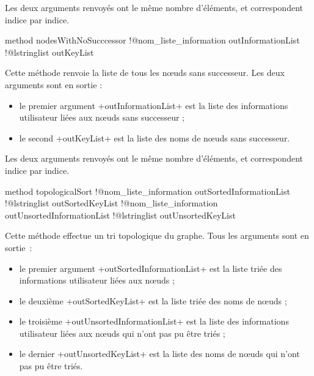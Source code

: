 Les deux arguments renvoyés ont le même nombre d'éléments, et correspondent indice par indice.







\begin{galgas}
method nodesWithNoSucccessor
  !@nom_liste_information outInformationList
  !@lstringlist outKeyList
\end{galgas}

Cette méthode renvoie la liste de tous les nœuds sans successeur. Les deux arguments sont en sortie :
\begin{itemize}
  \item le premier argument \ggs+outInformationList+ est la liste des informations utilisateur liées aux nœuds sans successeur ;
  \item le second \ggs+outKeyList+ est la liste des noms de nœuds sans successeur.
\end{itemize}

Les deux arguments renvoyés ont le même nombre d'éléments, et correspondent indice par indice.






\begin{galgas}
method topologicalSort
  !@nom_liste_information outSortedInformationList
  !@lstringlist outSortedKeyList
  !@nom_liste_information outUnsortedInformationList
  !@lstringlist outUnsortedKeyList
\end{galgas}

Cette méthode effectue un tri topologique du graphe. Tous les arguments sont en sortie~:
\begin{itemize}
  \item le premier argument \ggs+outSortedInformationList+ est la liste triée des informations utilisateur liées aux nœuds ;
  \item le deuxième \ggs+outSortedKeyList+ est la liste triée des noms de nœuds ;
  \item le troisième \ggs+outUnsortedInformationList+ est la liste des informations utilisateur liées aux nœuds qui n'ont pas pu être triés ;
  \item le dernier \ggs+outUnsortedKeyList+ est la liste des noms de nœuds qui n'ont pas pu être triés.
\end{itemize}

